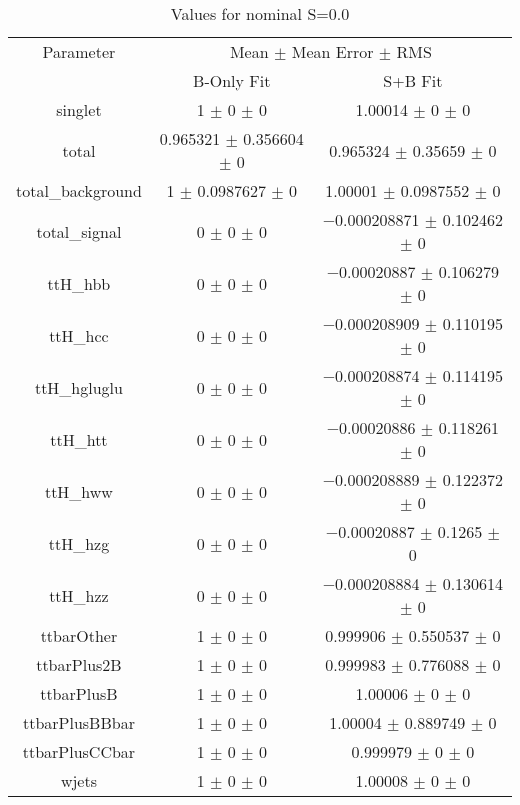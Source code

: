\begin{table}
\centering
\caption{Values for nominal S=0.0}
\begin{tabular}{ccc}
\toprule
Parameter & \multicolumn{2}{c}{Mean $\pm$ Mean Error $\pm$ RMS}\\
 & B-Only Fit & S+B Fit\\
\midrule
singlet & \num{1} $\pm$ \num{0} $\pm$ \num{0} & \num{1.00014} $\pm$ \num{0} $\pm$ \num{0}\\
total & \num{0.965321} $\pm$ \num{0.356604} $\pm$ \num{0} & \num{0.965324} $\pm$ \num{0.35659} $\pm$ \num{0}\\
total\_background & \num{1} $\pm$ \num{0.0987627} $\pm$ \num{0} & \num{1.00001} $\pm$ \num{0.0987552} $\pm$ \num{0}\\
total\_signal & \num{0} $\pm$ \num{0} $\pm$ \num{0} & \num{-0.000208871} $\pm$ \num{0.102462} $\pm$ \num{0}\\
ttH\_hbb & \num{0} $\pm$ \num{0} $\pm$ \num{0} & \num{-0.00020887} $\pm$ \num{0.106279} $\pm$ \num{0}\\
ttH\_hcc & \num{0} $\pm$ \num{0} $\pm$ \num{0} & \num{-0.000208909} $\pm$ \num{0.110195} $\pm$ \num{0}\\
ttH\_hgluglu & \num{0} $\pm$ \num{0} $\pm$ \num{0} & \num{-0.000208874} $\pm$ \num{0.114195} $\pm$ \num{0}\\
ttH\_htt & \num{0} $\pm$ \num{0} $\pm$ \num{0} & \num{-0.00020886} $\pm$ \num{0.118261} $\pm$ \num{0}\\
ttH\_hww & \num{0} $\pm$ \num{0} $\pm$ \num{0} & \num{-0.000208889} $\pm$ \num{0.122372} $\pm$ \num{0}\\
ttH\_hzg & \num{0} $\pm$ \num{0} $\pm$ \num{0} & \num{-0.00020887} $\pm$ \num{0.1265} $\pm$ \num{0}\\
ttH\_hzz & \num{0} $\pm$ \num{0} $\pm$ \num{0} & \num{-0.000208884} $\pm$ \num{0.130614} $\pm$ \num{0}\\
ttbarOther & \num{1} $\pm$ \num{0} $\pm$ \num{0} & \num{0.999906} $\pm$ \num{0.550537} $\pm$ \num{0}\\
ttbarPlus2B & \num{1} $\pm$ \num{0} $\pm$ \num{0} & \num{0.999983} $\pm$ \num{0.776088} $\pm$ \num{0}\\
ttbarPlusB & \num{1} $\pm$ \num{0} $\pm$ \num{0} & \num{1.00006} $\pm$ \num{0} $\pm$ \num{0}\\
ttbarPlusBBbar & \num{1} $\pm$ \num{0} $\pm$ \num{0} & \num{1.00004} $\pm$ \num{0.889749} $\pm$ \num{0}\\
ttbarPlusCCbar & \num{1} $\pm$ \num{0} $\pm$ \num{0} & \num{0.999979} $\pm$ \num{0} $\pm$ \num{0}\\
wjets & \num{1} $\pm$ \num{0} $\pm$ \num{0} & \num{1.00008} $\pm$ \num{0} $\pm$ \num{0}\\
\bottomrule
\end{tabular}
\end{table}